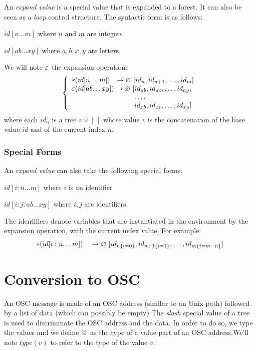 \documentclass[runningheads]{llncs}
\makeatletter
\newcommand{\forest}	{\ensuremath{\varnothing}}
\newcommand{\taddress}	{\ensuremath{\text{@}}}
\newcommand{\etc}		{\ensuremath{\text{…}}}
\newcommand{\emptyf}	{\ensuremath{[\ ]}}
\newcommand{\nexpand}	{\ensuremath{\varepsilon}}
\newcommand{\ulb}		{\hspace*{31.5mm}}
\makeatother
\begin{document}
An \emph{expand value} is a special value that is expanded to a forest. It can also be seen as a \emph{loop} control structure. The syntactic form is as follows:
\begin{description}
\item $id[n\etc m]$ 	where $n$ and $m$ are integers
\item $id[ab\etc xy]$ where $a,b,x,y$ are letters.
\end{description}
We will note \nexpand\ the expansion operation:
\[
\left\{
\begin{array}{l}
	\nexpand(id[n\etc m])   \ \ \to \forest \ [id_n,id_{n+1},\etc ,id_m] \\
	\nexpand(id[ab\etc xy]) \to \forest \ [id_{ab},id_{ac},\etc ,id_{ay}, \\
	\ulb \etc ,\\
	\ulb id_{xb},id_{xc},\etc ,id_{xy}]
\end{array}
\right.
\]
where each $id_n$ is a tree $v \times \emptyf$ whose value $v$ is the concatenation of the base value $id$ and of the current index $n$.

\subsubsection{Special Forms}

An \emph{expand value} can also take the following special forms: 
\begin{description}
\item $id[i:n\etc m]$ 	where $i$ is an identifier
\item $id[i:j:ab\etc xy]$ where $i,j$ are identifiers.
\end{description}
The identifiers denote variables that are instantiated in the environment by the expansion operation, with the current index value. For example:
\[
	\nexpand(id[i:n\etc m])   \quad \to \forest \ [id_{n\{i=0\}},id_{n+1\{i=1\}},\etc ,id_{m\{i=m-n\}}] \\
\]

\section{Conversion to OSC}\label{sslash}

An OSC message is made of an OSC address (similar to an Unix path) followed by a list of data (which can possibly be empty)
The \emph{slash} special value of a tree is used to discriminate the OSC address and the data. In order to do so, we type the values and we define \taddress\ as the type of a value part of an OSC address.We'll note $type(v)$ to refer to the type of the value $v$.
\end{document}
